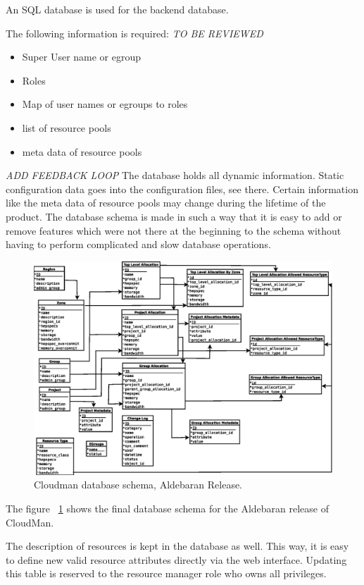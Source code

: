 An SQL database is used for the backend database. 

The following information is required:
{\it TO BE REVIEWED}
\begin{itemize}
\item Super User name or egroup
\item Roles
\item Map of user names or egroups to roles
\item list of resource pools
\item meta data of resource pools
\end{itemize}

{\it ADD FEEDBACK LOOP}
The database holds all dynamic information. Static configuration data goes into the configuration files, see there. 
Certain information like the meta data of resource pools may change during the lifetime of the product. The database schema is made in such a way that it is easy to add or remove features which were not there at the beginning to the schema without having to perform complicated and slow database operations. 

\begin{figure}
\begin{center}
\includegraphics[width=\textwidth]{cloudman_db.eps}
\caption{\label{ddb_schema_new} Cloudman database schema, Aldebaran Release.}
\end{center}
\end{figure}

The figure ~\ref{ddb_schema_new} shows the final database schema for the Aldebaran release of CloudMan.


The description of resources is kept in the database as well. This way, it is easy to define new valid resource attributes directly via the web interface. Updating this table is reserved to the resource manager role who owns all privileges. 

